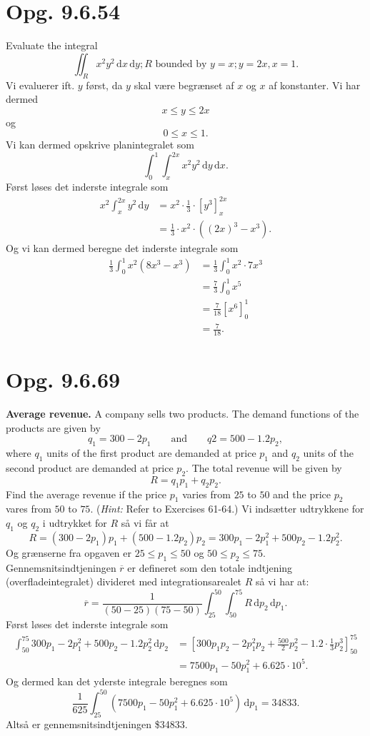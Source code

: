 \documentclass[12pt]{article}
\theoremstyle{definition}
\begin{document}
\section*{Opg. 9.6.54}
Evaluate the integral
\[ 
\iint_R x^2y^2 \, \mathrm{d}x \, \mathrm{d}y ; R \text{ bounded by } y = x; y = 2x, x = 1
.\]
\bigbreak
Vi evaluerer ift. $y$ først, da $y$ skal være begrænset af $x$ og $x$ af konstanter. Vi har dermed
\[ 
x \leq y \leq 2x
\]
og
\[ 
0 \leq x \leq 1
.\]
Vi kan dermed opskrive planintegralet som
\[
  \int_{0}^{1} \int_{x}^{2x} x^2y^2 \, \mathrm{d}y \, \mathrm{d}x
.\]
Først løses det inderste integrale som
\begin{align*}
  x^2 \int_{x}^{2x} y^2 \, \mathrm{d}y &= x^2 \cdot \frac{1}{3} \cdot \left[ y^3 \right]_{x}^{2x}  \\
  &=  \frac{1}{3} \cdot x^2 \cdot \left( (2x)^3 - x^3 \right) 
.\end{align*}
Og vi kan dermed beregne det inderste integrale som
\begin{align*}
  \frac{1}{3} \int_{0}^{1} x^2 \left( 8x^3 - x^3 \right) &= \frac{1}{3} \int_{0}^{1}  x^2 \cdot 7x^3 \\
  &= \frac{7}{3} \int_{0}^{1} x^{5} \\
  &= \frac{7}{18} [x^{6}]_0^{1} \\
  &= \frac{7}{18}
.\end{align*}


\section*{Opg. 9.6.69}
\textbf{Average revenue.} A company sells two products. The demand functions of the products are given by
\[ 
q_1 = 300 - 2p_1 \qquad \text{and} \qquad  q2 = 500 - \num{1,2}p_2
,\]
where $q_1$ units of the first product are demanded at price $p_1$ and $q_2$ units of the second product are demanded at price $p_2$. The total revenue will be given by
\[ 
R = q_1p_1 + q_2p_2
.\]
Find the average revenue if the price $p_1$ varies from $25$ to $50$ and the price $p_2$ vares from $50$ to $75$. (\textit{Hint:} Refer to Exercises 61-64.)
\bigbreak
Vi indsætter udtrykkene for $q_1$ og $q_2$ i udtrykket for $R$ så vi får at
\[ 
R = (300 - 2p_1)p_1 + (500 - \num{1,2}p_2)p_2 = 300p_1 - 2p_1^2 + 500p_2 - \num{1,2}p_2^2
.\]
Og grænserne fra opgaven er $25 \leq p_1 \leq 50$ og $50 \leq p_2 \leq 75$. Gennemsnitsindtjeningen $\overline{r}$ er defineret som den totale indtjening (overfladeintegralet) divideret med integrationsarealet $R$ så vi har at:
\[ 
\overline{r} = \frac{1}{(50-25)(75-50)}\int_{25}^{50} \int_{50}^{75} R \, \mathrm{d}p_2 \, \mathrm{d}p_1
.\]
Først løses det inderste integrale som
\begin{align*}
  \int_{50}^{75} 300p_1 - 2p_1^2 + 500p_2 - \num{1,2}p_2^2 \, \mathrm{d}p_2 &= \left[ 300p_1p_2 - 2p_1^2p_2 + \frac{500}{2}p_2^2 - \num{1,2}\cdot \frac{1}{3} p_2^3 \right]_{50}^{75} \\
  &= 7500p_1 - 50 p_1^2 + \num{6,625} \cdot 10^5
.\end{align*}
Og dermed kan det yderste integrale beregnes som
\[
\frac{1}{625} \int_{25}^{50} \left( 7500p_1 - 50 p_1^2 + \num{6,625} \cdot 10^5 \right) \, \mathrm{d}p_1 = \num{34833} 
.\]
Altså er gennemsnitsindtjeningen \$\num{34833}.
\end{document}
